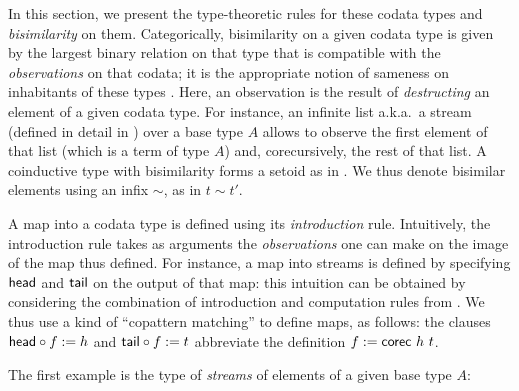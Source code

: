 \documentclass[a4paper,USenglish]{lipics}
\begin{document}
In this section, we present the type-theoretic rules for these codata types and \emph{bisimilarity} on them.
Categorically, bisimilarity on a given codata type is given by the largest binary relation on that type that is 
compatible with the \emph{observations} on that codata; it is the appropriate notion of sameness on inhabitants of these types \parencite{DBLP:conf/types/Coquand93}.
Here, an observation is the result of \emph{destructing} an element of a given codata type.
For instance, an infinite list a.k.a.\ a stream (defined in detail in ) over a base type $A$ allows to observe the first element of that list (which is a term of type $A$) and,
corecursively, the rest of that list.
A coinductive type with bisimilarity forms a setoid as in .
We thus denote bisimilar elements using an infix $\sim$, as in $t \sim t'$. 

A map into a codata type is defined using its \emph{introduction} rule.
Intuitively, the introduction rule takes as arguments the \emph{observations} one can make on the image of the map thus defined.
For instance, a map into streams is defined by specifying $\mathsf{head}$ and $\mathsf{tail}$ on the output of that map: this intuition
  can be obtained by considering the combination of introduction and computation rules from .
  We thus use a kind of \enquote{copattern matching} \parencite{DBLP:conf/popl/AbelPTS13} to define maps, as follows: 
  the clauses ${\mathsf{head}} \circ {f} := h$ and ${\mathsf{tail}} \circ {f}:= t$ abbreviate the definition $f := \mathsf{corec}~h~t$.







The first example is the type of \emph{streams} of elements of a given base type $A$:
\end{document}
